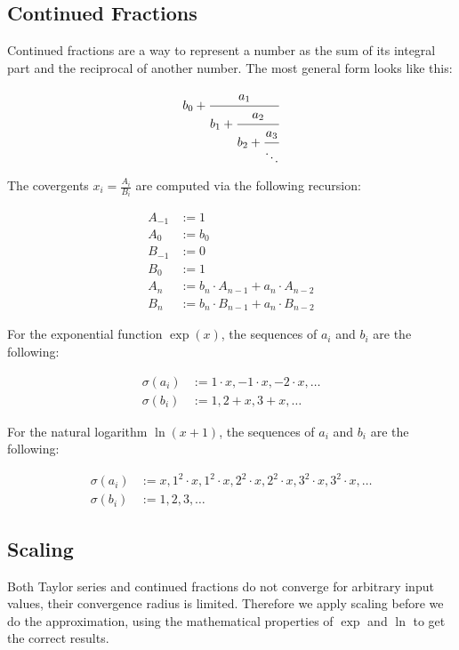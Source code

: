 \documentclass[11pt,a4paper,dvipsnames]{article}
\theoremstyle{definition}
\theoremstyle{definition}
\begin{document}
\subsection{Continued Fractions}
\label{sec:continued-fractions}

Continued fractions are a way to represent a number as the sum of its integral
part and the reciprocal of another number. The most general form looks like
this:

\begin{equation*}
  b_{0} + \cfrac{a_{1}}{b_{1} + \cfrac{a_{2}}{b_{2}  + \cfrac{a_{3}}{\ddots}}}
\end{equation*}

The covergents $x_{i} = \frac{A_{i}}{B_{i}}$ are computed via the following
recursion:

\begin{align*}
  A_{-1} & :=  1 \\
  A_{0} & :=  b_{0} \\
  B_{-1} & :=  0 \\
  B_{0} & := 1 \\
  A_{n} & :=  b_{n}\cdot A_{n-1} + a_{n}\cdot A_{n-2} \\
  B_{n} & :=  b_{n}\cdot B_{n-1} + a_{n}\cdot B_{n-2}
\end{align*}

For the exponential function $\exp(x)$, the sequences of $a_{i}$ and $b_{i}$ are
the following:

\begin{align*}
  \sigma(a_{i}) & := 1 \cdot x, -1 \cdot x, -2 \cdot x, \ldots \\
  \sigma(b_{i}) & := 1, 2 + x, 3 + x, \ldots
\end{align*}

For the natural logarithm $\ln(x+1)$, the sequences of $a_{i}$ and $b_{i}$ are
the following:

\begin{align*}
  \sigma(a_{i}) & := x, 1^{2}\cdot x, 1^{2}\cdot x, 2^{2}\cdot x, 2^{2}\cdot x, 3^{2}\cdot
          x, 3^{2}\cdot x, \ldots\\
  \sigma(b_{i}) & := 1, 2, 3, \ldots
\end{align*}

\subsection{Scaling}
\label{sec:scaling}

Both Taylor series and continued fractions do not converge for arbitrary input
values, their convergence radius is limited. Therefore we apply scaling before
we do the approximation, using the mathematical properties of $\exp$ and $\ln$
to get the correct results.
\end{document}
